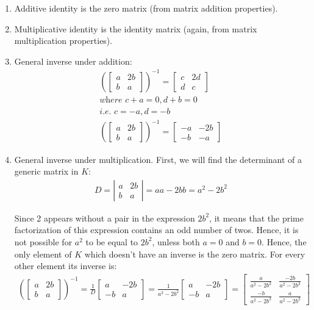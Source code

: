 \documentclass[11pt]{article}
\begin{document}
\begin{enumerate}
\item Additive identity is the zero matrix (from matrix addition properties).
\item Multiplicative identity is the identity matrix (again, from matrix
multiplication properties).
\item General inverse under addition:
\begin{align*}
  \left(\begin{bmatrix}
    a & 2b \\
    b & a
  \end{bmatrix}\right)^{-1} =
  \begin{bmatrix}
    c & 2d \\
    d & c
  \end{bmatrix} \\
  \textit{where } c + a = 0, d + b = 0 \\
  \textit{i.e. } c = -a, d = -b \\
  \left(\begin{bmatrix}
    a & 2b \\
    b & a
  \end{bmatrix}\right)^{-1} =
  \begin{bmatrix}
    -a & -2b \\
    -b & -a
  \end{bmatrix}
\end{align*}

\item General inverse under multiplication.  First, we will find the
determinant of a generic matrix in $K$:
\begin{align*}
D = \left|
  \begin{array}{ll}
    a & 2b \\
    b & a
  \end{array} \right| = aa - 2bb = a^2 - 2b^2
\end{align*}

Since 2 appears without a pair in the expression $2b^2$, it means that
the prime factorization of this expression contains an odd number of
twos.  Hence, it is not possible for $a^2$ to be equal to $2b^2$, unless
both $a = 0$ and $b = 0$.  Hence, the only element of $K$ which doesn't
have an inverse is the zero matrix.  For every other element its inverse
is:
\begin{align*}
  \left(\begin{bmatrix}
    a & 2b \\
    b & a 
  \end{bmatrix}\right)^{-1} =
  \frac{1}{D}\begin{bmatrix}
    a  & -2b \\
    -b & a 
  \end{bmatrix} = 
  \frac{1}{a^2 - 2b^2}\begin{bmatrix}
    a  & -2b \\
    -b & a 
  \end{bmatrix} = 
  \begin{bmatrix}
    \frac{a}{a^2 - 2b^2}  & \frac{-2b}{a^2 - 2b^2} \\
    \frac{-b}{a^2 - 2b^2} & \frac{a}{a^2 - 2b^2}
  \end{bmatrix}
\end{align*}


\end{enumerate}
\end{document}
